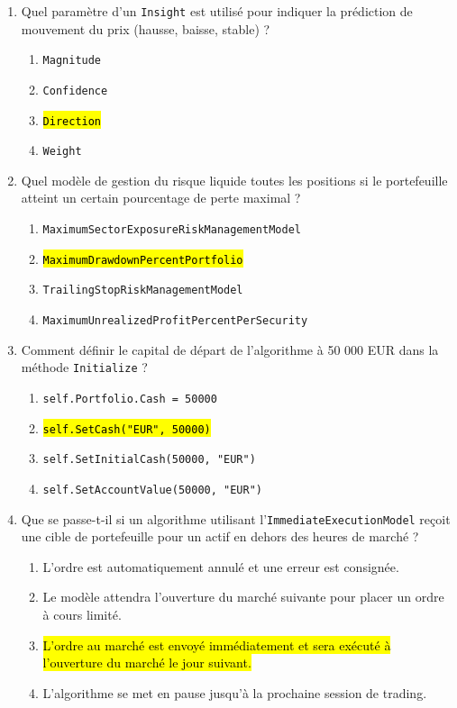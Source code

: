 \documentclass[a4paper,12pt]{article}
\begin{document}
\begin{enumerate}
    \item Quel paramètre d'un \texttt{Insight} est utilisé pour indiquer la prédiction de mouvement du prix (hausse, baisse, stable) ?
    \begin{enumerate}[label=(\Alph*)]
        \item \texttt{Magnitude}
        \item \texttt{Confidence}
        \item \hl{\texttt{Direction}}
        \item \texttt{Weight}
    \end{enumerate}

    \item Quel modèle de gestion du risque liquide toutes les positions si le portefeuille atteint un certain pourcentage de perte maximal ?
    \begin{enumerate}[label=(\Alph*)]
        \item \texttt{MaximumSectorExposureRiskManagementModel}
        \item \hl{\texttt{MaximumDrawdownPercentPortfolio}}
        \item \texttt{TrailingStopRiskManagementModel}
        \item \texttt{MaximumUnrealizedProfitPercentPerSecurity}
    \end{enumerate}

    \item Comment définir le capital de départ de l'algorithme à 50 000 EUR dans la méthode \texttt{Initialize} ?
    \begin{enumerate}[label=(\Alph*)]
        \item \texttt{self.Portfolio.Cash = 50000}
        \item \hl{\texttt{self.SetCash("EUR", 50000)}}
        \item \texttt{self.SetInitialCash(50000, "EUR")}
        \item \texttt{self.SetAccountValue(50000, "EUR")}
    \end{enumerate}

    \item Que se passe-t-il si un algorithme utilisant l'\texttt{ImmediateExecutionModel} reçoit une cible de portefeuille pour un actif en dehors des heures de marché ?
    \begin{enumerate}[label=(\Alph*)]
        \item L'ordre est automatiquement annulé et une erreur est consignée.
        \item Le modèle attendra l'ouverture du marché suivante pour placer un ordre à cours limité.
        \item \hl{L'ordre au marché est envoyé immédiatement et sera exécuté à l'ouverture du marché le jour suivant.}
        \item L'algorithme se met en pause jusqu'à la prochaine session de trading.
    \end{enumerate}
\end{enumerate}
\end{document}
